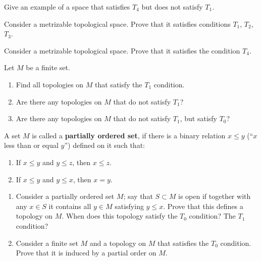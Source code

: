 \documentclass[12pt]{article}
\begin{document}
\begin{zadacha}[*]
  Give an example of a space that satisfies $T_4$ but does not satisfy
  $T_1$.
\end{zadacha}

\begin{zadacha} 
Consider a metrizable topological space. Prove that it satisfies
conditions $T_1$, $T_2$, $T_3$.
\end{zadacha}

\begin{zadacha}[*]
Consider a metrizable topological space. Prove that it satisfies the
condition $T_4$. 
\end{zadacha}

\begin{zadacha}[*]
Let $M$ be a finite set.
\begin{enumerate}
\item Find all topologies on $M$ that satisfy the $T_1$ condition.
\item Are there any topologies on $M$ that do not satisfy $T_1$?
\item Are there any topologies on $M$ that do not satisfy $T_1$, but
  satisfy $T_0$?
\end{enumerate}
\end{zadacha}

\begin{opredelenie}
  A set $M$ is called a {\bf partially ordered set}, if there is a
  binary relation $x \le y$ (``$x$ less than or equal $y$'') defined
  on it such that:
\begin{enumerate}
\renewcommand{\labelenumi}{\arabic{enumi}.}
\item If $x \le y$ and $y \le z$, then $x \le z$.
\item If $x \le y$ and $y \le x$, then $x=y$.
\end{enumerate}
\end{opredelenie}

\begin{zadacha}[*]
\begin{enumerate}
\item Consider a partially ordered set $M$; say that $S \subset M$ 
is open if together with any  $x \in S$ it
  contains all $y \in M$ satisfying $y \le x$. Prove that this defines
  a topology on $M$. When does this topology satisfy the $T_0$
  condition? The $T_1$ condition?
\item Consider a finite set $M$ and a topology on $M$ 
that satisfies the $T_0$
  condition. Prove that it is induced by a partial order on $M$.
\end{enumerate}
\end{zadacha}
\end{document}
